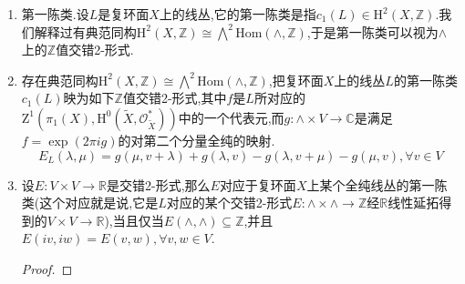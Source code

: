 \begin{enumerate}
	$$\mathrm{H}^1(\pi_1(X),\mathrm{H}^0(\widetilde{X},\mathscr{O}_{\widetilde{X}}^*))\cong\ker\left(\xymatrix{\mathrm{H}^1(X,\mathscr{O}_X^*)\ar[r]^{\pi^*}&\mathrm{H}^1(\widetilde{X},\mathscr{O}^*_{\widetilde{X}})}\right)$$
	特别的,如果$X=V/\wedge$是复环面,那么$\pi^*$是零映射,于是有函子性的同构:
	$$\mathrm{H}^1(\pi_1(X),\mathrm{H}^0(\widetilde{X},\mathscr{O}_{\widetilde{X}}^*))\cong\mathrm{H}^1(X,\mathscr{O}_X^*)$$
	\item 第一陈类.设$L$是复环面$X$上的线丛,它的第一陈类是指$c_1(L)\in\mathrm{H}^2(X,\mathbb{Z})$.我们解释过有典范同构$\mathrm{H}^2(X,\mathbb{Z})\cong\bigwedge^2\mathrm{Hom}(\wedge,\mathbb{Z})$,于是第一陈类可以视为$\wedge$上的$\mathbb{Z}$值交错2-形式.
	\item 存在典范同构$\mathrm{H}^2(X,\mathbb{Z})\cong\bigwedge^2\mathrm{Hom}(\wedge,\mathbb{Z})$,把复环面$X$上的线丛$L$的第一陈类$c_1(L)$映为如下$\mathbb{Z}$值交错2-形式,其中$f$是$L$所对应的$\mathrm{Z}^1(\pi_1(X),\mathrm{H}^0(\widetilde{X},\mathscr{O}_{\widetilde{X}}^*))$中的一个代表元,而$g:\wedge\times V\to\mathbb{C}$是满足$f=\exp(2\pi ig)$的对第二个分量全纯的映射.
	$$E_L(\lambda,\mu)=g(\mu,v+\lambda)+g(\lambda,v)-g(\lambda,v+\mu)-g(\mu,v),\forall v\in V$$
	\item 设$E:V\times V\to\mathbb{R}$是交错2-形式,那么$E$对应于复环面$X$上某个全纯线丛的第一陈类(这个对应就是说,它是$L$对应的某个交错2-形式$E:\wedge\times\wedge\to\mathbb{Z}$经$\mathbb{R}$线性延拓得到的$V\times V\to\mathbb{R}$),当且仅当$E(\wedge,\wedge)\subseteq\mathbb{Z}$,并且$E(iv,iw)=E(v,w),\forall v,w\in V$.
	\begin{proof}
		

\end{proof}
\end{enumerate}
